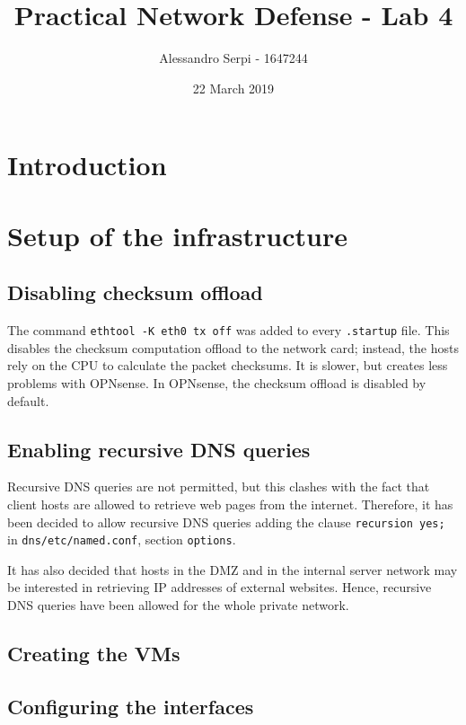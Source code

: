 \documentclass[draft]{homework}
\title{Practical Network Defense - Lab 4}
\author{Alessandro Serpi - 1647244}
\date{22 March 2019}
\newcommand{\opn}{OPNsense\xspace}
\begin{document}
    \maketitle
    \tableofcontents
    
    
    \section{Introduction}
    
    
    \section{Setup of the infrastructure}
    \subsection{Disabling checksum offload}
    The command \texttt{ethtool -K eth0 tx off} was added to every \texttt{.startup} file. This disables the checksum computation offload to the network card; instead, the hosts rely on the CPU to calculate the packet checksums. It is slower, but creates less problems with \opn.
    In \opn, the checksum offload is disabled by default.
    
    \subsection{Enabling recursive DNS queries}
    Recursive DNS queries are not permitted, but this clashes with the fact that client hosts are allowed to retrieve web pages from the internet. Therefore, it has been decided to allow recursive DNS queries adding the clause \texttt{recursion yes;} in \texttt{dns/etc/named.conf}, section \texttt{options}.
    
    It has also decided that hosts in the DMZ and in the internal server network may be interested in retrieving IP addresses of external websites. Hence, recursive DNS queries have been allowed for the whole private network.
    
    \subsection{Creating the VMs}
    
    \subsection{Configuring the interfaces}
    
\end{document}
